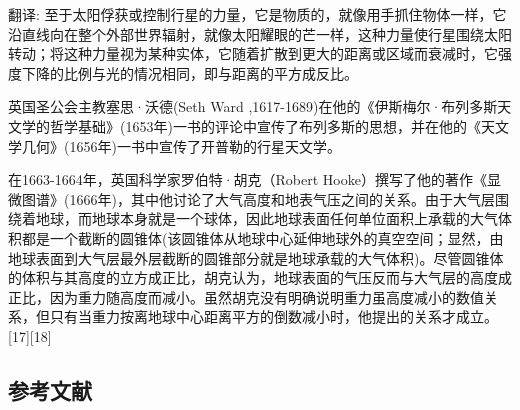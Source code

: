 翻译: 至于太阳俘获或控制行星的力量，它是物质的，就像用手抓住物体一样，它沿直线向在整个外部世界辐射，就像太阳耀眼的芒一样，这种力量使行星围绕太阳转动；将这种力量视为某种实体，它随着扩散到更大的距离或区域而衰减时，它强度下降的比例与光的情况相同，即与距离的平方成反比。

英国圣公会主教塞思·沃德(Seth Ward ,1617-1689)在他的《伊斯梅尔·布列多斯天文学的哲学基础》(1653年)一书的评论中宣传了布列多斯的思想，并在他的《天文学几何》(1656年)一书中宣传了开普勒的行星天文学。

在1663-1664年，英国科学家罗伯特·胡克（Robert Hooke）撰写了他的著作《显微图谱》(1666年)，其中他讨论了大气高度和地表气压之间的关系。由于大气层围绕着地球，而地球本身就是一个球体，因此地球表面任何单位面积上承载的大气体积都是一个截断的圆锥体(该圆锥体从地球中心延伸地球外的真空空间；显然，由地球表面到大气层最外层截断的圆锥部分就是地球承载的大气体积)。尽管圆锥体的体积与其高度的立方成正比，胡克认为，地球表面的气压反而与大气层的高度成正比，因为重力随高度而减小。虽然胡克没有明确说明重力虽高度减小的数值关系，但只有当重力按离地球中心距离平方的倒数减小时，他提出的关系才成立。[17][18]
\subsection{参考文献}

